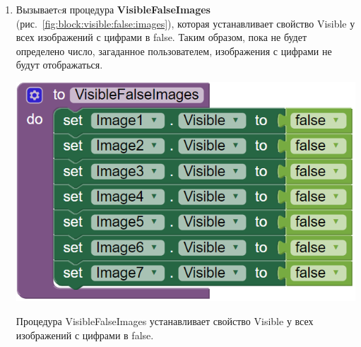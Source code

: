 \begin{enumerate}
  \item Вызываетcя процедура \textbf{VisibleFalseImages} (рис.~\ref{fig:block:visible:false:images}), которая устанавливает свойство Visible у всех изображений с цифрами в false. Таким образом, пока не будет определено число, загаданное пользователем, изображения с цифрами не будут отображаться.
  \begin{marginfigure}[-2em]
    \includegraphics{./graphics/programs/guess_numbers/procedure_visibleFalseImages_AppInventor_2018.png}
      \caption[Процедура VisibleFalseImages.]{Процедура VisibleFalseImages устанавливает свойство Visible у всех изображений с цифрами в false.}
    \label{fig:block:visible:false:images}
  \end{marginfigure}


\end{enumerate}

